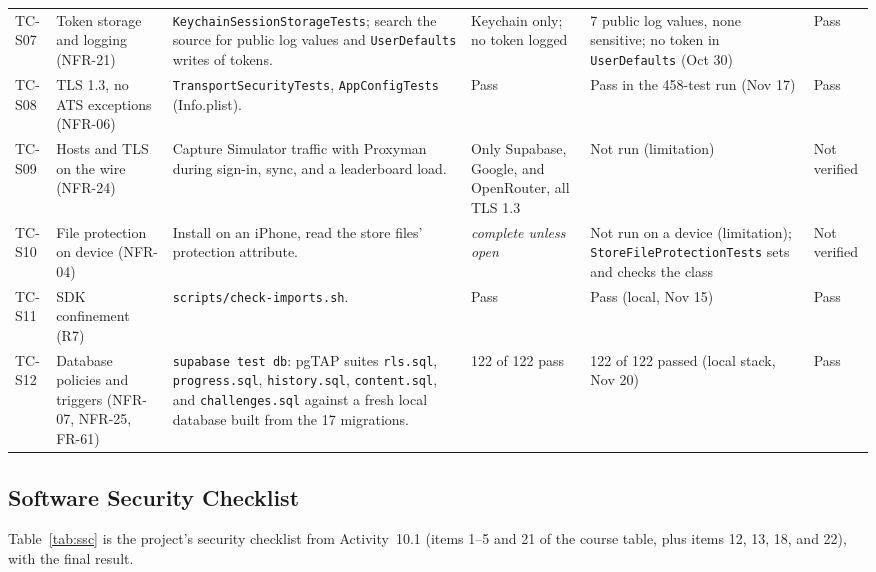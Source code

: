 \documentclass[12pt,letterpaper]{article}
\begin{document}
\begin{xltabular}{\textwidth}{@{}L{1.2cm} L{2.4cm} Y L{2.4cm} L{2.4cm} L{1.5cm}@{}}
TC-S07 & Token storage and logging (NFR-21) & \texttt{KeychainSessionStorageTests}; search the source for public log values and \texttt{UserDefaults} writes of tokens. & Keychain only; no token logged & 7 public log values, none sensitive; no token in \texttt{UserDefaults} (Oct 30) & Pass \\
TC-S08 & TLS 1.3, no ATS exceptions (NFR-06) & \texttt{TransportSecurityTests}, \texttt{AppConfigTests} (Info.plist). & Pass & Pass in the 458-test run (Nov 17) & Pass \\
TC-S09 & Hosts and TLS on the wire (NFR-24) & Capture Simulator traffic with Proxyman during sign-in, sync, and a leaderboard load. & Only Supabase, Google, and OpenRouter, all TLS 1.3 & Not run (limitation) & Not verified \\
TC-S10 & File protection on device (NFR-04) & Install on an iPhone, read the store files' protection attribute. & \emph{complete unless open} & Not run on a device (limitation); \texttt{StoreFileProtectionTests} sets and checks the class & Not verified \\
TC-S11 & SDK confinement (R7) & \texttt{scripts/check-imports.sh}. & Pass & Pass (local, Nov 15) & Pass \\
TC-S12 & Database policies and triggers (NFR-07, NFR-25, FR-61) & \texttt{supabase test db}: pgTAP suites \texttt{rls.sql}, \texttt{progress.sql}, \texttt{history.sql}, \texttt{content.sql}, and \texttt{challenges.sql} against a fresh local database built from the 17 migrations. & 122 of 122 pass & 122 of 122 passed (local stack, Nov 20) & Pass \\
\end{xltabular}

\subsection{Software Security Checklist}
Table~\ref{tab:ssc} is the project's security checklist from Activity~10.1 (items 1--5
and 21 of the course table, plus items 12, 13, 18, and 22), with the final result.
\end{document}
